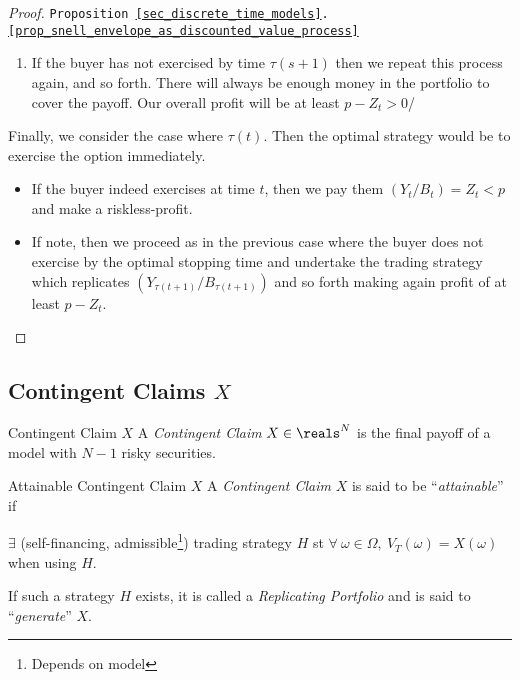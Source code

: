 \documentclass[11pt,a4paper]{article}
\begin{document}
\begin{proof}{\texttt{Proposition \ref{sec_discrete_time_models}.\ref{prop_snell_envelope_as_discounted_value_process}}}
\begin{enumerate}
\begin{itemize}
        \item We repeat the process, undertaking the trading strategy that replicates $Y_{\tau(s+1)}/B_{\tau(s+1)}$.
        \item The value of the portfolio to be built up is equal to
        \[ \expect_\Q[Y_{\tau(s+1)}/B_{\tau(s+1)}|\mathcal{F}_s]\leq\expect_\Q[Y_{\tau(s)}/B_{\tau(s)}|\mathcal{F}_s]=Z_s \]
        Therefore the change of the portfolio will only pay us some money which we put in the bank account.
        \item As before, if the option buyer exercises at some time $u\leq\tau(s+1)$ then the value of the portfolio will be enough to cover the payoff $Y_u$.
      \end{itemize}
      \item If the buyer has not exercised by time $\tau(s+1)$ then we repeat this process again, and so forth. There will always be enough money in the portfolio to cover the payoff. Our overall profit will be at least $p-Z_t>0$/
    \end{enumerate}
    Finally, we consider the case where $\tau(t)$. Then the optimal strategy would be to exercise the option immediately.
    \begin{itemize}
      \item If the buyer indeed exercises at time $t$, then we pay them $(Y_t/B_t)=Z_t<p$ and make a riskless-profit.
      \item If note, then we proceed as in the previous case where the buyer does not exercise by the optimal stopping time and undertake the trading strategy which replicates $(Y_{\tau(t+1)}/B_{\tau(t+1)})$ and so forth making again profit of at least $p-Z_t$.
    \end{itemize}
    \proved
  \end{proof}

\subsection{Contingent Claims $X$}

  \begin{definition}{Contingent Claim $X$}
    A \textit{Contingent Claim} $X\in\reals^N$ is the final payoff of a model with $N-1$ risky securities.
  \end{definition}

  \begin{definition}{Attainable Contingent Claim $X$}
    A \textit{Contingent Claim} $X$ is said to be ``\textit{attainable}'' if
    \begin{center}
      $\exists$ (self-financing, admissible\footnote{Depends on model}) trading strategy $H$ st $\forall\ \omega\in\Omega,\ V_T(\omega)=X(\omega)$ when using $H$.
    \end{center}
    If such a strategy $H$ exists, it is called a \textit{Replicating Portfolio} and is said to ``\textit{generate}'' $X$.
  \end{definition}
\end{document}
